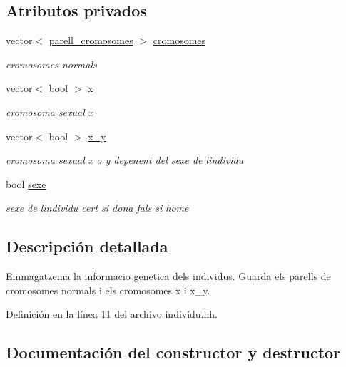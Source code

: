\subsection*{Atributos privados}
\begin{DoxyCompactItemize}
\item 
vector$<$ \hyperlink{classparell__cromosomes}{parell\+\_\+cromosomes} $>$ \hyperlink{classindividu_ae5e0a83ff9e943cbcdf95b74069ad3a7}{cromosomes}
\begin{DoxyCompactList}\small\item\em cromosomes normals \end{DoxyCompactList}\item 
vector$<$ bool $>$ \hyperlink{classindividu_a3c4abda8daead156b5519f69bd224fa9}{x}
\begin{DoxyCompactList}\small\item\em cromosoma sexual x \end{DoxyCompactList}\item 
vector$<$ bool $>$ \hyperlink{classindividu_a51eb7827fdd5bd5302e3c962fd719fc0}{x\+\_\+y}
\begin{DoxyCompactList}\small\item\em cromosoma sexual x o y depenent del sexe de l\textquotesingle{}individu \end{DoxyCompactList}\item 
bool \hyperlink{classindividu_ab62faa6985cc0520c33a206fc5a89e37}{sexe}
\begin{DoxyCompactList}\small\item\em sexe de l\textquotesingle{}individu cert si dona fals si home \end{DoxyCompactList}\end{DoxyCompactItemize}


\subsection{Descripción detallada}
Emmagatzema la informacio genetica dels individus. Guarda els parells de cromosomes normals i els cromosomes x i x\+\_\+y. 

Definición en la línea 11 del archivo individu.\+hh.



\subsection{Documentación del constructor y destructor}
